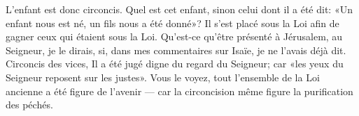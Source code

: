 L'enfant est donc circoncis.
Quel est cet enfant, sinon celui dont il a été dit:
	«Un enfant nous est né, un fils nous a été donné»?
Il s'est placé sous la Loi afin de gagner ceux qui étaient sous la Loi.
Qu'est-ce qu'être présenté à Jérusalem, au Seigneur, je le dirais,
	si, dans mes commentaires sur Isaïe, je ne l'avais déjà dit.
Circoncis des vices, Il a été jugé digne du regard du Seigneur;
	car «les yeux du Seigneur reposent sur les justes».
Vous le voyez, tout l'ensemble de la Loi ancienne a été figure de l'avenir ---
	car la circoncision même figure la purification des péchés.
